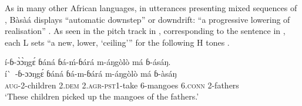 \documentclass[output=paper,newtxmath,modfonts,nonflat]{langsci/langscibook}
\begin{document}
\begin{table}
\caption{Tonal minimal pairs in Bàsà{á} \citep{MakassoLee15}}
\label{tab:HamlaouiMakasso:1}
\end{table}

As in many other African  languages, in utterances presenting mixed sequences of , Bàsà{á} displays ``automatic downstep'' or downdrift: 
``a progressive lowering of  realisation'' \citep[2]{DowningRialland16}. As seen in the pitch track in , corresponding to the sentence in , each L  sets ``a new, lower, `ceiling'{}'' for the following H tones \citep{Connell11}.

\ea í-ɓ-\`ɔ\`ɔŋg\'ɛ ɓ{á}n{á} ɓ{á}-\'m-ɓ{á}r{á} m-{á}ŋgòlò m{á} ɓ-{á}{\textdownstep}s{á}ŋ.\\
\gll í\`~-ɓ-ɔɔŋg\'ɛ ɓ{á}n{á} ɓ{á}-m-ɓ{á}r{á} m-{á}ŋgòlò m{á} ɓ-às{á}ŋ\\
\textsc{aug}-2-children 2.\textsc{dem} 2.\textsc{agr}-\textsc{pst1}-take 6-mangoes 6.\textsc{conn} 2-fathers\\
\glt `These children picked up the mangoes of the fathers.' \label{ex:HamlaouiMakasso:1} \\ \citep{MakassoEtAl17}
\z
\end{document}
